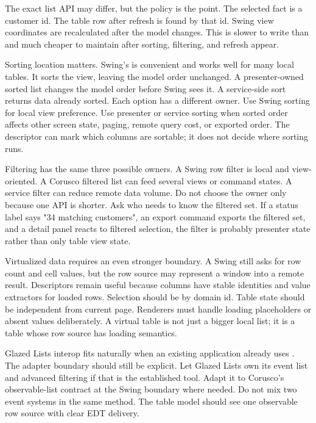 The exact list API may differ, but the policy is the point. The selected fact
is a customer id. The table row after refresh is found by that id. Swing view
coordinates are recalculated after the model changes. This is slower to write
than  and much cheaper to maintain after sorting,
filtering, and refresh appear.

Sorting location matters. Swing's  is convenient and works
well for many local tables. It sorts the view, leaving the model order
unchanged. A presenter-owned sorted list changes the model order before Swing
sees it. A service-side sort returns data already sorted. Each option has a
different owner. Use Swing sorting for local view preference. Use presenter or
service sorting when sorted order affects other screen state, paging, remote
query cost, or exported order. The descriptor can mark which columns are
sortable; it does not decide where sorting runs.

Filtering has the same three possible owners. A Swing row filter is local and
view-oriented. A Corusco filtered list can feed several views or command
states. A service filter can reduce remote data volume. Do not choose the
owner only because one API is shorter. Ask who needs to know the filtered set.
If a status label says "34 matching customers", an export command exports the
filtered set, and a detail panel reacts to filtered selection, the filter is
probably presenter state rather than only table view state.

Virtualized data requires an even stronger boundary. A Swing 
still asks for row count and cell values, but the row source may represent a
window into a remote result. Descriptors remain useful because columns have
stable identities and value extractors for loaded rows. Selection should be by
domain id. Table state should be independent from current page. Renderers must
handle loading placeholders or absent values deliberately. A virtual table is
not just a bigger local list; it is a table whose row source has loading
semantics.

Glazed Lists interop fits naturally when an existing application already uses
. The adapter boundary should still be explicit. Let Glazed
Lists own its event list and advanced filtering if that is the established
tool. Adapt it to Corusco's observable-list contract at the Swing boundary
where needed. Do not mix two event systems in the same method. The table model
should see one observable row source with clear EDT delivery.

